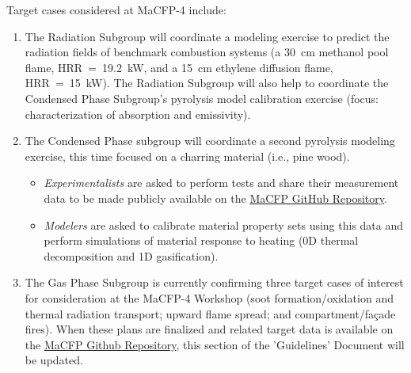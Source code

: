 \documentclass[12pt]{article}
\begin{document}
\clearpage
Target cases considered at MaCFP-4 include:
\begin{enumerate} [noitemsep]
\item The Radiation Subgroup will coordinate a modeling exercise to predict the radiation fields of benchmark combustion systems (a 30~cm methanol pool flame, HRR~=~19.2~kW, and a 15~cm ethylene diffusion flame, HRR~=~15~kW). The Radiation Subgroup will also help to coordinate the Condensed Phase Subgroup's pyrolysis model calibration exercise (focus: characterization of absorption and emissivity).\\
\item The Condensed Phase subgroup will coordinate a second pyrolysis modeling exercise, this time focused on a charring material (i.e., pine wood). 
\begin{itemize}
    \item \emph{Experimentalists} are asked to perform tests and share their measurement data to be made publicly available on the \href{https://github.com/MaCFP/matl-db/}{MaCFP GitHub Repository}. 
    \item \emph{Modelers} are asked to calibrate material property sets using this data and perform simulations of material response to heating (0D thermal decomposition and 1D gasification).
\end{itemize}
\item The Gas Phase Subgroup is currently confirming three target cases of interest for consideration at the MaCFP-4 Workshop (soot formation/oxidation and thermal radiation transport; upward flame spread; and compartment/façade fires). When these plans are finalized and related target data is available on the \href{https://github.com/MaCFP/macfp-db}{MaCFP Github Repository}, this section of the 'Guidelines' Document will be updated.
\end{enumerate}
\end{document}
